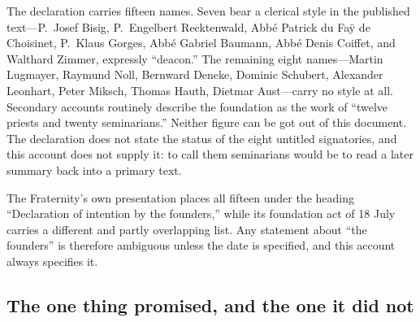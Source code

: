 The declaration carries fifteen names. Seven bear a clerical style in the
published text---P.\ Josef Bisig, P.\ Engelbert Recktenwald, Abbé Patrick
du Faÿ de Choisinet, P.\ Klaus Gorges, Abbé Gabriel Baumann, Abbé Denis
Coiffet, and Walthard Zimmer, expressly ``deacon.'' The remaining eight
names---Martin Lugmayer, Raymund Noll, Bernward Deneke, Dominic Schubert,
Alexander Leonhart, Peter Miksch, Thomas Hauth, Dietmar Aust---carry no
style at all. Secondary accounts routinely describe the foundation as the
work of ``twelve priests and twenty seminarians.'' Neither figure can be
got out of this document. The declaration does not state the status of
the eight untitled signatories, and this account does not supply it: to
call them seminarians would be to read a later summary back into a
primary text.

The Fraternity's own presentation places all fifteen under the heading
``Declaration of intention by the founders,'' while its foundation act of
18 July carries a different and partly overlapping list. Any statement
about ``the founders'' is therefore ambiguous unless the date is
specified, and this account always specifies it.


\subsection{The one thing  promised, and the one it did not}

